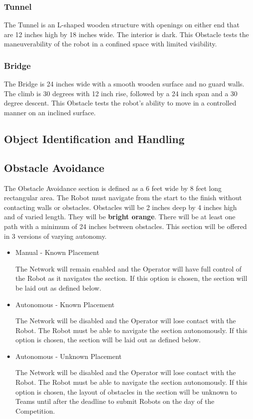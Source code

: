 \subsubsection{Tunnel}
The Tunnel is an L-shaped wooden structure with openings on either end that are 12 inches high by 18 inches wide. The interior is dark. This Obstacle tests the maneuverability of the robot in a confined space with limited visibility.

\subsubsection{Bridge}
The Bridge is 24 inches wide with a smooth wooden surface and no guard walls. The climb is 30 degrees with 12 inch rise, followed by a 24 inch span and a 30 degree descent. This Obstacle tests the robot’s ability to move in a controlled manner on an inclined surface.

\subsection{Object Identification and Handling}


\subsection{Obstacle Avoidance}
The Obstacle Avoidance section is defined as a 6 feet wide by 8 feet long rectangular area. The Robot must navigate from the start to the finish without contacting walls or obstacles. Obstacles will be 2 inches deep by 4 inches high and of varied length. They will be \textbf{bright orange}. There will be at least one path with a minimum of 24 inches between obstacles. This section will be offered in 3 versions of varying autonomy.

\begin{itemize}
    \item Manual - Known Placement
    
        The Network will remain enabled and the Operator will have full control of the Robot as it navigates the section. If this option is chosen, the section will be laid out as defined below.
    \item Autonomous - Known Placement
    
        The Network will be disabled and the Operator will lose contact with the Robot. The Robot must be able to navigate the section autonomously. If this option is chosen, the section will be laid out as defined below.
    \item Autonomous - Unknown Placement
    
        The Network will be disabled and the Operator will lose contact with the Robot. The Robot must be able to navigate the section autonomously. If this option is chosen, the layout of obstacles in the section will be unknown to Teams until after the deadline to submit Robots on the day of the Competition. 
        
\end{itemize}